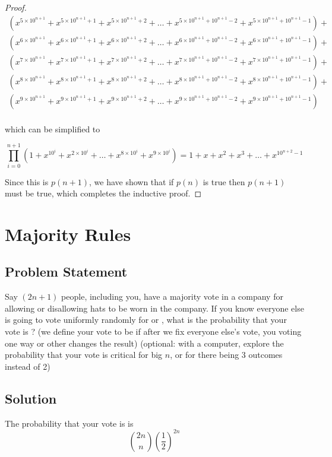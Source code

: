 \documentclass[12pt]{article}
\newcommand{\ProblemStatement}[1]{
\subsection*{Problem Statement}
#1
\subsection*{Solution}
}
\begin{document}
\begin{proof}
\begin{align*}
\left(x^{5\times10^{n+1}} + x^{5\times10^{n+1}+1} + x^{5\times10^{n+1}+2} + \dots + x^{5\times10^{n+1} + 10^{n+1}-2} + x^{5\times10^{n+1} + 10^{n+1}-1}\right) +\\
\left(x^{6\times10^{n+1}} + x^{6\times10^{n+1}+1} + x^{6\times10^{n+1}+2} + \dots + x^{6\times10^{n+1} + 10^{n+1}-2} + x^{6\times10^{n+1} + 10^{n+1}-1}\right) +\\
\left(x^{7\times10^{n+1}} + x^{7\times10^{n+1}+1} + x^{7\times10^{n+1}+2} + \dots + x^{7\times10^{n+1} + 10^{n+1}-2} + x^{7\times10^{n+1} + 10^{n+1}-1}\right) +\\
\left(x^{8\times10^{n+1}} + x^{8\times10^{n+1}+1} + x^{8\times10^{n+1}+2} + \dots + x^{8\times10^{n+1} + 10^{n+1}-2} + x^{8\times10^{n+1} + 10^{n+1}-1}\right) +\\
\left(x^{9\times10^{n+1}} + x^{9\times10^{n+1}+1} + x^{9\times10^{n+1}+2} + \dots + x^{9\times10^{n+1} + 10^{n+1}-2} + x^{9\times10^{n+1} + 10^{n+1}-1}\right)\\
\end{align*}

which can be simplified to 

\[
\prod_{i=0}^{n+1} \left(1 + x^{10^i} + x^{2\times10^i} + \dots + x^{8\times10^i} + x^{9\times10^i}\right) = 1 + x + x^2 + x^3 + \dots + x^{10^{n+2}-1}
\]

Since this is $p(n+1)$, we have shown that if $p(n)$ is true then $p(n+1)$ must be true, which completes the inductive proof.


\end{proof}

\section{Majority Rules}
\ProblemStatement{
Say $(2n + 1)$ people, including you, have a majority vote in a company for
allowing or disallowing hats to be worn in the company. If you know everyone
else is going to vote uniformly randomly for \say{yes} or \say{no}, what is the
probability that your vote is \say{critical}? (we define your vote to be
\say{critical} if after we fix everyone else's vote, you voting one way or
other changes the result) (optional: with a computer, explore the probability
that your vote is critical for big $n$, or for there being 3 outcomes instead
of 2)
}

The probability that your vote is  is 
\[
    \binom{2n}{n}\left(\frac{1}{2}\right)^{2n}
\]
\end{document}
